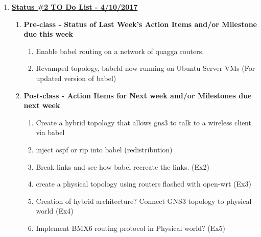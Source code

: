 \documentclass[main.tex]{subfiles}
\begin{document}
\begin{enumerate}[leftmargin=12mm,labelsep=0.1cm]
     \item[] \textbf{\Large \underline{Status \#2 TO Do List - 4/10/2017}}
    \begin{enumerate}
         \item \textbf{Pre-class - Status of Last Week's Action Items and/or Milestone due this week}
         \begin{enumerate}
            \item Enable babel routing on a network of quagga routers.
            \item Revamped topology, babeld now running on Ubuntu Server VMs (For updated version of babel)
         \end{enumerate}
         \item \textbf{Post-class - Action Items for Next week and/or Milestones due next week}
         \begin{enumerate}
            \item Create a hybrid topology that allows gns3 to talk to a wireless client via babel
            \item inject ospf or rip into babel (redistribution)
            \item Break links and see how babel recreate the links. (Ex2)
            \item create a physical topology using routers flashed with open-wrt (Ex3)
            \item Creation of hybrid architecture? Connect GNS3 topology to physical world (Ex4)
            \item Implement BMX6 routing protocol in Physical world? (Ex5)
         \end{enumerate}
    \end{enumerate}
    

\end{enumerate}
\end{document}
